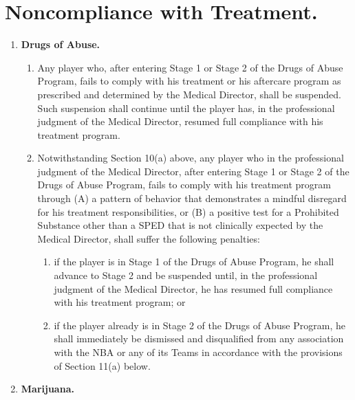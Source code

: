 \documentclass[
]{book}
\providecommand{\tightlist}{%
  \setlength{\itemsep}{0pt}\setlength{\parskip}{0pt}}
\begin{document}
\hypertarget{noncompliance-with-treatment.}{%
\section{Noncompliance with Treatment.}\label{noncompliance-with-treatment.}}

\begin{enumerate}
\def\labelenumi{(\alph{enumi})}
\tightlist
\item
  \textbf{Drugs of Abuse.}

  \begin{enumerate}
  \def\labelenumii{(\roman{enumii})}
  \tightlist
  \item
    Any player who, after entering Stage 1 or Stage 2 of the Drugs of Abuse Program, fails to comply with his treatment or his aftercare program as prescribed and determined by the Medical Director, shall be suspended. Such suspension shall continue until the player has, in the professional judgment of the Medical Director, resumed full compliance with his treatment program.
  \item
    Notwithstanding Section 10(a) above, any player who in the professional judgment of the Medical Director, after entering Stage 1 or Stage 2 of the Drugs of Abuse Program, fails to comply with his treatment program through (A) a pattern of behavior that demonstrates a mindful disregard for his treatment responsibilities, or (B) a positive test for a Prohibited Substance other than a SPED that is not clinically expected by the Medical Director, shall suffer the following penalties:

    \begin{enumerate}
    \def\labelenumiii{(\arabic{enumiii})}
    \tightlist
    \item
      if the player is in Stage 1 of the Drugs of Abuse Program, he shall advance to Stage 2 and be suspended until, in the professional judgment of the Medical Director, he has resumed full compliance with his treatment program; or
    \item
      if the player already is in Stage 2 of the Drugs of Abuse Program, he shall immediately be dismissed and disqualified from any association with the NBA or any of its Teams in accordance with the provisions of Section 11(a) below.
    \end{enumerate}
  \end{enumerate}
\item
  \textbf{Marijuana.}


\end{enumerate}
\end{document}
